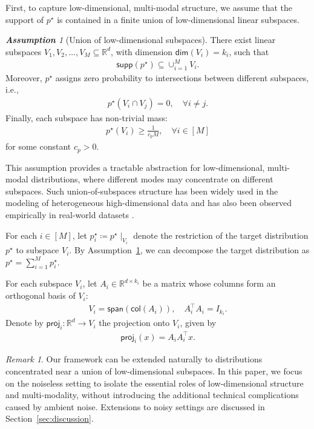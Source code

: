 \documentclass{article}
\newcommand{\defn}{\coloneqq}
\newcommand{\col}{\mathsf{col}}
\newcommand{\proj}{\mathsf{proj}}
\newcommand{\supp}{\mathsf{supp}}
\theoremstyle{plain}
\theoremstyle{remark}
\newtheorem{assumption}{\bf Assumption}
\newtheorem{remark}{Remark}
\begin{document}
First, to capture low-dimensional, multi-modal structure, we assume that the support of $p^\star$ is contained in a finite union of low-dimensional linear subspaces.
\begin{assumption}[Union of low-dimensional subspaces]
    \label{assume:multi-modal}
    There exist linear subspaces $V_1, V_2, \ldots, V_M \subseteq \mathbb{R}^d$, with dimension $\mathsf{dim}(V_i) = k_i$, such that 
    \begin{align*}
        \supp(p^\star) \subseteq \cup_{i=1}^M V_i.
    \end{align*}
    Moreover, $p^\star$ assigns zero probability to intersections between different subspaces, i.e.,
    \begin{align}
        p^\star(V_i \cap V_j) = 0, \quad \forall i\neq j. \label{eq:separation}
    \end{align}
    Finally, each subspace has non-trivial mass:
    \begin{align}
        p^\star(V_i) \geq \frac{1}{c_{p}M}, \quad \forall i\in [M]
    \end{align}
    for some constant $c_{p}>0$. 
\end{assumption}

This assumption provides a tractable abstraction for low-dimensional, multi-modal distributions, where different modes may concentrate on different subspaces. Such union-of-subspaces structure has been widely used in the modeling of heterogeneous high-dimensional data \citep{wang2025diffusionmodelslearnlowdimensional} and has also been observed empirically in real-world datasets \citep{brown2022verifying,kamkari2024geometric}.

For each $i\in [M]$, let $p_i^\star \defn p^\star \mid_{V_i}$ denote the restriction of the target distribution $p^\star$ to subspace $V_i$. By Assumption~\ref{assume:multi-modal}, we can decompose the target distribution as $p^\star = \sum_{i=1}^M p_i^\star$. 


For each subspace $V_i$, let $A_i \in \mathbb{R}^{d\times k_i}$ be a matrix whose columns form an orthogonal basis of $V_i$: 
\begin{align*}
    V_i = \mathsf{span}(\col(A_i)), \quad A_i^{\top}A_i = I_{k_i}.
\end{align*}
Denote by $\proj_i:\mathbb{R}^d \rightarrow V_i$ the projection onto $V_i$, given by
\begin{align*}
    \proj_i(x) = A_iA_i^{\top}x.
\end{align*}
\begin{remark}
    Our framework can be extended naturally to distributions concentrated near a union of low-dimensional subspaces. In this paper, we focus on the noiseless setting to isolate the essential roles of low-dimensional structure and multi-modality, without introducing the additional technical complications caused by ambient noise. Extensions to noisy settings are discussed in Section~\ref{sec:discussion}.
\end{remark}
\end{document}
